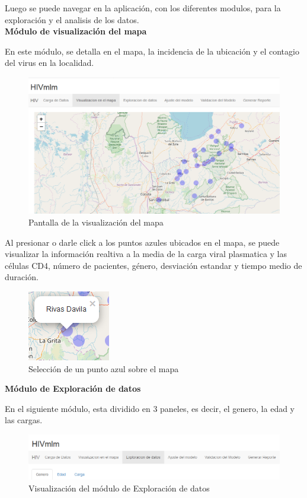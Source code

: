 Luego se puede navegar en la aplicaci\'on, con los diferentes modulos, para la exploraci\'on y el analisis de los datos.\\

 \noindent
\textbf{M\'odulo de visualizaci\'on del mapa}

En este m\'odulo, se detalla en el mapa, la incidencia de la ubicaci\'on y el contagio del virus en la localidad.

\begin{figure}[H]
  \centering
  \includegraphics[scale=0.6]{mapa1.PNG}
   \caption{Pantalla de la visualizaci\'on del mapa}
  \end{figure}
  
Al presionar o darle click a los puntos azules ubicados en el mapa, se puede visualizar la informaci\'on realtiva a la media de la carga viral plasmatica y las c\'elulas CD4, n\'umero de pacientes, g\'enero, desviaci\'on estandar y tiempo medio de duraci\'on.

\begin{figure}[H]
\centering
\includegraphics[scale=0.8]{mapa2.PNG}
\caption{Selecci\'on de un punto azul sobre el mapa}
\end{figure}

\textbf{M\'odulo de Exploraci\'on de datos}

En el siguiente m\'odulo, esta dividido en 3 paneles, es decir, el genero, la edad y las cargas. 

\begin{figure}[H]
\centering
\includegraphics[scale=0.6]{explorar.PNG}
\caption{Visualizaci\'on del m\'odulo de Exploraci\'on de datos}
\end{figure}

